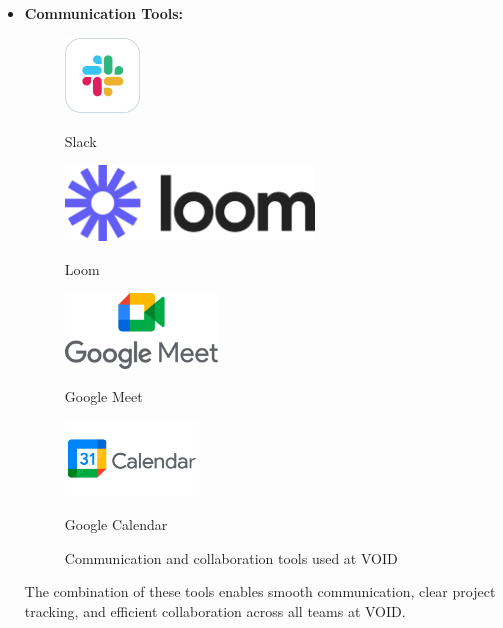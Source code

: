 \begin{itemize}
    \item \textbf{Communication Tools:} 
    \begin{figure}[H]
        \centering
        \begin{minipage}{0.45\textwidth}
            \centering
            \includegraphics[height=2cm]{images/slack.png}
            \caption{Slack}
        \end{minipage}
        \begin{minipage}{0.45\textwidth}
            \centering
            \includegraphics[height=2cm]{images/loom.png}
            \caption{Loom}
        \end{minipage}
        \vspace{0.5cm}
        \begin{minipage}{0.45\textwidth}
            \centering
            \includegraphics[height=2cm]{images/google-meet.png}
            \caption{Google Meet}
        \end{minipage}
        \begin{minipage}{0.45\textwidth}
            \centering
            \includegraphics[height=2cm]{images/google-calendar.png}
            \caption{Google Calendar}
        \end{minipage}
        \caption{Communication and collaboration tools used at VOID}
    \end{figure}

    \medskip

    \noindent
    The combination of these tools enables smooth communication, clear project tracking, and efficient collaboration across all teams at VOID.
\end{itemize}

